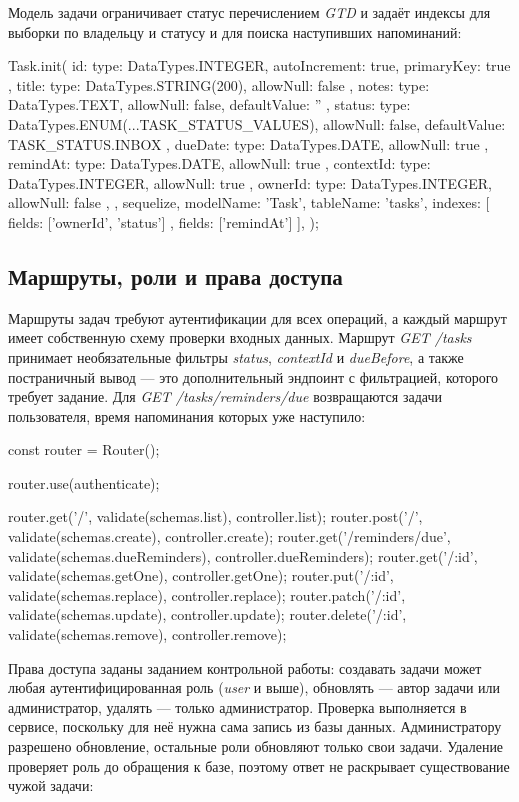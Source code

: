 \documentclass{stp}
\newcommand{\en}[1]{\textit{#1}}
\begin{document}
Модель задачи ограничивает статус перечислением \en{GTD} и задаёт индексы
для выборки по владельцу и статусу и для поиска наступивших напоминаний:

\begin{stplisting}
Task.init({
  id: { type: DataTypes.INTEGER, autoIncrement: true,
    primaryKey: true },
  title: { type: DataTypes.STRING(200), allowNull: false },
  notes: { type: DataTypes.TEXT, allowNull: false,
    defaultValue: '' },
  status: { type: DataTypes.ENUM(...TASK_STATUS_VALUES),
    allowNull: false, defaultValue: TASK_STATUS.INBOX },
  dueDate: { type: DataTypes.DATE, allowNull: true },
  remindAt: { type: DataTypes.DATE, allowNull: true },
  contextId: { type: DataTypes.INTEGER, allowNull: true },
  ownerId: { type: DataTypes.INTEGER, allowNull: false },
}, {
  sequelize, modelName: 'Task', tableName: 'tasks',
  indexes: [{ fields: ['ownerId', 'status'] },
    { fields: ['remindAt'] }],
});
\end{stplisting}

\subsection{Маршруты, роли и права доступа}

Маршруты задач требуют аутентификации для всех операций, а каждый маршрут
имеет собственную схему проверки входных данных. Маршрут
\en{GET /tasks} принимает необязательные фильтры \en{status},
\en{contextId} и \en{dueBefore}, а также постраничный вывод --- это
дополнительный эндпоинт с фильтрацией, которого требует задание. Для
\en{GET /tasks/reminders/due} возвращаются задачи пользователя, время
напоминания которых уже наступило:

\begin{stplisting}
const router = Router();

router.use(authenticate);

router.get('/', validate(schemas.list), controller.list);
router.post('/', validate(schemas.create), controller.create);
router.get('/reminders/due', validate(schemas.dueReminders),
  controller.dueReminders);
router.get('/:id', validate(schemas.getOne), controller.getOne);
router.put('/:id', validate(schemas.replace),
  controller.replace);
router.patch('/:id', validate(schemas.update),
  controller.update);
router.delete('/:id', validate(schemas.remove),
  controller.remove);
\end{stplisting}

Права доступа заданы заданием контрольной работы: создавать задачи может
любая аутентифицированная роль (\en{user} и выше), обновлять --- автор
задачи или администратор, удалять --- только администратор. Проверка
выполняется в сервисе, поскольку для неё нужна сама запись из базы данных.
Администратору разрешено обновление, остальные роли обновляют только свои
задачи. Удаление проверяет роль до обращения к базе, поэтому ответ не
раскрывает существование чужой задачи:
\end{document}
